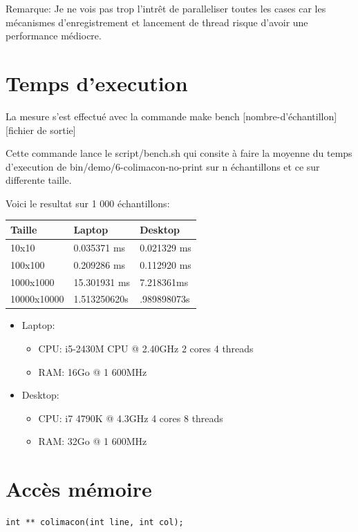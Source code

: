 \documentclass[a4paper]{article}
\begin{document}
Remarque: Je ne vois pas trop l'intrêt de paralleliser toutes les cases car
les mécanismes d'enregistrement et lancement de thread risque d'avoir une
performance médiocre.

\section{Temps d'execution}

La mesure s'est effectué avec la commande make bench [nombre-d'échantillon]
[fichier de sortie]

Cette commande lance le script/bench.sh qui consite à faire la moyenne du temps
d'execution de bin/demo/6-colimacon-no-print sur n échantillons et ce sur
differente taille.

Voici le resultat sur 1 000 échantillons:

\begin{tabular}{|l|l|l|}
  \hline
  Taille & Laptop & Desktop \\
  \hline
  10x10 & 0.035371 ms & 0.021329 ms\\
  \hline
  100x100 & 0.209286 ms & 0.112920 ms \\
  \hline
  1000x1000 & 15.301931 ms & 7.218361ms \\
  \hline
  10000x10000 & 1.513250620s & .989898073s \\
  \hline
\end{tabular}


\begin{itemize}
  \item Laptop:
    \begin{itemize}
      \item CPU: i5-2430M CPU @ 2.40GHz 2 cores 4 threads
      \item RAM: 16Go @ 1 600MHz
    \end{itemize}
  \item Desktop:
    \begin{itemize}
      \item CPU: i7 4790K @ 4.3GHz 4 cores 8 threads
      \item RAM: 32Go @ 1 600MHz
    \end{itemize}
\end{itemize}

\section{Accès mémoire}

\begin{lstlisting}[frame=single]
int ** colimacon(int line, int col);
\end{lstlisting}
\end{document}
